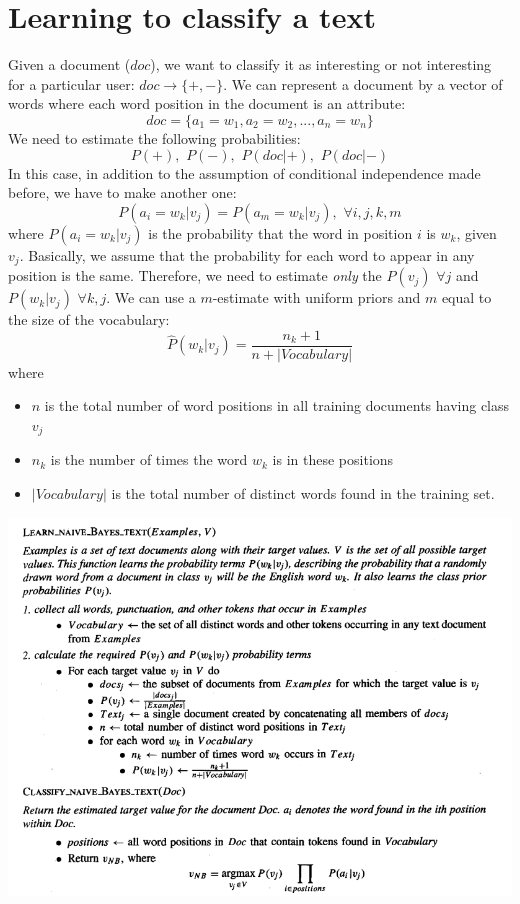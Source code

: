 \section{Learning to classify a text}
Given a document ($doc$), we want to classify it as interesting or not interesting for a particular user: $doc \rightarrow \{+, -\}$. We can represent a document by a vector of words where each word position in the document is an attribute:
\[doc = \{a_{1} = w_{1}, a_{2} = w_{2},..., a_{n} = w_{n}\}\]
We need to estimate the following probabilities:
\[P(+), \,\, P(-), \,\, P(doc | +), \,\, P(doc | -)\]
In this case, in addition to the assumption of conditional independence made before, we have to make another one:
\[P(a_{i} = w_{k} | v_{j}) = P(a_{m} = w_{k} | v_{j}), \,\, \forall i, j, k, m\]
where $P(a_{i} = w_{k} | v_{j})$ is the probability that the word in position $i$ is $w_{k}$, given $v_{j}$. Basically, we assume that the probability for each word to appear in any position is the same.\newline\newline
Therefore, we need to estimate \textit{only} the $P(v_{j}) \,\, \forall j$ and $P(w_{k} | v_{j}) \,\, \forall k, j$.\newline\newline
We can use a $m$-estimate with uniform priors and $m$ equal to the size of the vocabulary:
\[\hat{P}(w_{k} | v_{j}) = \frac{n_{k} + 1}{n + |Vocabulary|}\]
where
\begin{itemize}
    \item $n$ is the total number of word positions in all training documents having class $v_{j}$

    \item $n_{k}$ is the number of times the word $w_{k}$ is in these positions

    \item $|Vocabulary|$ is the total number of distinct words found in the training set.
\end{itemize}
\begin{center}
    \includegraphics[]{images/training_naive_bayesian.png}
\end{center}

